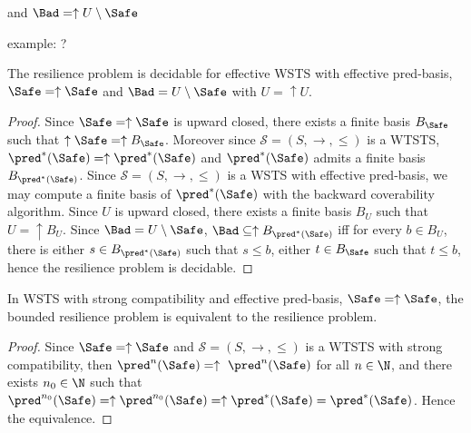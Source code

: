 
and $\Bad = \uparrow U \setminus \Safe $

example: ?


\begin{theorem}\label{up-up}
The resilience problem is decidable for effective WSTS with effective pred-basis, $\Safe=\uparrow \Safe$
and $\Bad= U \setminus \Safe$ with $U = \uparrow U$.
\end{theorem}


\begin{proof}
Since $\Safe=\uparrow \Safe$ is upward closed, there exists a finite basis $B_{ \Safe}$ such that $\uparrow \Safe = \uparrow B_{\Safe}$. 
Moreover since $\mathscr{S}=(S,\rightarrow,\leq)$ is a WTSTS,  $\pred^*(\Safe)=\uparrow \pred^*(\Safe)$ and $\pred^*(\Safe)$ admits a finite basis $B_{\pred^*(\Safe)}$. Since $\mathscr{S}=(S,\rightarrow,\leq)$ is a WSTS  with effective pred-basis, we may compute a finite basis of $\pred^*(\Safe)$ with the backward coverability algorithm. 
Since $U$  is upward closed, there exists a finite basis $B_{U}$ such that $U = \uparrow B_{U}$. %
Since $\Bad = U \setminus \Safe$, $\Bad \subseteq \uparrow B_{\pred^*(\Safe)}$ iff for every $b \in B_{U}$, there is either $s \in B_{\pred^*(\Safe)}$ such that $s \leq b$, either $t \in B_{\Safe}$ such that $t\leq b$,
hence the resilience problem is decidable.
\end{proof}

\begin{proposition}
In WSTS with strong compatibility and effective pred-basis,  $\Safe=\uparrow \Safe$, the bounded resilience problem is equivalent to the resilience problem.
\end{proposition}

\begin{proof}
Since $\Safe=\uparrow \Safe$ and
$\mathscr{S}=(S,\rightarrow,\leq)$ is a WTSTS with strong %
compatibility, then $\pred^n(\Safe)= \uparrow~\pred^n(\Safe)$ for all $n \in \N$,
and there exists $n_0 \in \N$ such that 
$\pred^{n_0}(\Safe) = \uparrow \pred^{n_0}(\Safe) = \uparrow \pred^*(\Safe) = \pred^*(\Safe)$.
Hence the equivalence.
\end{proof}

